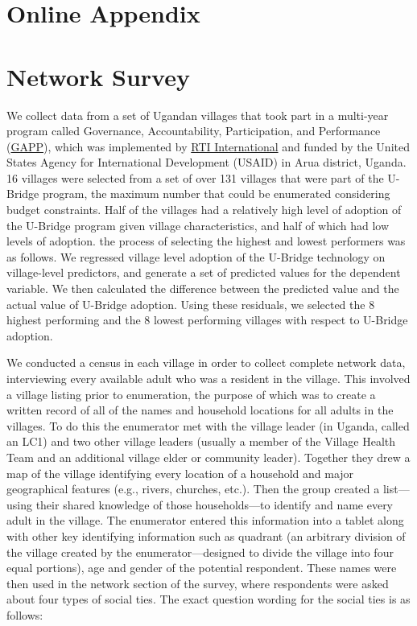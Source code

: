 \documentclass[12pt]{article}
\begin{document}
\vspace*{-0.4cm}

\clearpage
\singlespacing
 

\clearpage

\doublespacing
\begin{appendix}
\section*{Online Appendix}
\setcounter{page}{1}
\section{Network Survey}\label{appendix_surveydetails}
We collect data from a set of Ugandan villages that took part in a multi-year program called Governance, Accountability, Participation, and Performance (\href{https://www.rti.org/impact/uganda-governance-accountability-participation-and-performance-gapp}{GAPP}), which was implemented by \href{https://www.rti.org/}{RTI International} and funded by the United States Agency for International Development (USAID) in Arua district, Uganda. 16 villages were selected from a set of over 131 villages that were part of the U-Bridge program, the maximum number that could be enumerated considering budget constraints. Half of the villages had a relatively high level of adoption of the U-Bridge program given village characteristics, and half of which had low levels of adoption. the process of selecting the highest and lowest performers was as follows. We regressed village level adoption of the U-Bridge technology on village-level predictors, and generate a set of predicted values for the dependent variable. We then calculated the difference between the predicted value and the actual value of U-Bridge adoption. Using these residuals, we selected the 8 highest performing and the 8 lowest performing villages with respect to U-Bridge adoption.

We conducted a census in each village in order to collect complete network data, interviewing every available adult who was a resident in the village. This involved a village listing prior to enumeration, the purpose of which was to create a written record of all of the names and household locations for all adults in the villages. To do this the enumerator met with the village leader (in Uganda, called an LC1) and two other village leaders (usually a member of the Village Health Team and an additional village elder or community leader). Together they drew a map of the village identifying every location of a household and major geographical features (e.g., rivers, churches, etc.). Then the group created a list---using their shared knowledge of those households---to identify and name every adult in the village. The enumerator entered this information into a tablet along with other key identifying information such as quadrant (an arbitrary division of the village created by the enumerator---designed to divide the village into four equal portions), age and gender of the potential respondent. These names were then used in the network section of the survey, where respondents were asked about four types of social ties. The exact question wording for the social ties is as follows:


\end{appendix}
\end{document}
